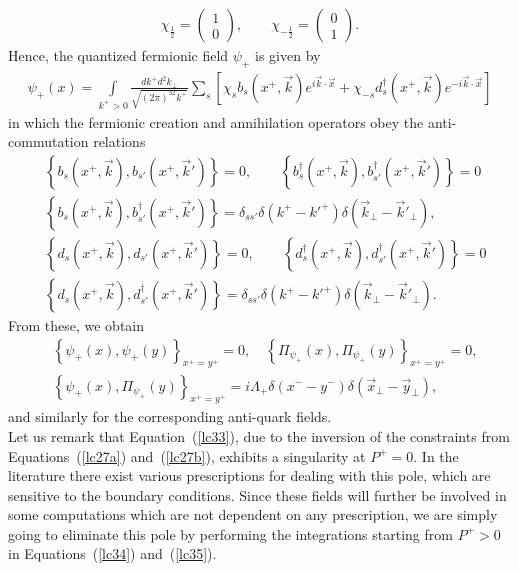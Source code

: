 \begin{align*}
\chi_{\frac{1}{2}}=\begin{pmatrix}1 \\ 0 \end{pmatrix}, \qquad \chi_{-\frac{1}{2}}=\begin{pmatrix}0 \\ 1 \end{pmatrix}.
\end{align*}
Hence, the quantized fermionic field $\psi_+$ is given by
\begin{align}\label{lc35}
\psi_+(x)=\int\limits_{k^+>0}\frac{dk^+d^2k_\perp}{\sqrt{(2\pi)^32k^+}}\sum_s\left[\chi_sb_s(x^+,\vec{k})e^{i\vec{k}\cdot \vec{x}}+\chi_{-s}d_s^\dag(x^+,\vec{k}) e^{-i\vec{k}\cdot \vec{x}}\right]
\end{align}
in which the fermionic creation and annihilation operators obey the anti-commutation relations
\begin{equation}\label{lc39}
   \begin{aligned}
    &\left\lbrace b_s(x^+,\vec{k}),b_{s'}(x^+,\vec{k}')\right\rbrace=0,\qquad \left\lbrace b_s^\dag(x^+,\vec{k}),b_{s'}^\dag(x^+,\vec{k}')\right\rbrace=0\\
    &\left\lbrace b_s(x^+,\vec{k}),b_{s'}^\dag(x^+,\vec{k}')\right\rbrace=\delta_{ss'}\delta(k^+-k'^+)\delta\left(\vec{k}_\perp-\vec{k}'_\perp\right),\\
    &\left\lbrace d_s(x^+,\vec{k}),d_{s'}(x^+,\vec{k}')\right\rbrace=0,\qquad \left\lbrace d_s^\dag(x^+,\vec{k}),d_{s'}^\dag(x^+,\vec{k}')\right\rbrace=0\\
    &\left\lbrace d_s(x^+,\vec{k}),d_{s'}^\dag(x^+,\vec{k}')\right\rbrace=\delta_{ss'}\delta(k^+-k'^+)\delta(\vec{k}_\perp-\vec{k}'_\perp).
\end{aligned} 
\end{equation}
From these, we obtain
\begin{equation*}
\begin{aligned}
&\left\lbrace\psi_+(x),\psi_+(y)\right\rbrace_{x^+=y^+}=0,\quad \left\lbrace\Pi_{\psi_+}(x),\Pi_{\psi_+}(y)\right\rbrace_{x^+=y^+}=0,\\
&\left\lbrace\psi_+(x),\Pi_{\psi_+}(y)\right\rbrace_{x^+=y^+}=i\Lambda_+\delta(x^--y^-)\delta(\vec{x}_\perp-\vec{y}_\perp),
\end{aligned}
\end{equation*}
and similarly for the corresponding anti-quark fields. \\ \noindent
Let us remark that Equation~(\cref{lc33}), due to the inversion of the constraints from Equations~(\cref{lc27a}) and~(\cref{lc27b}), exhibits a singularity at $P^+=0$. In the literature there exist various prescriptions for dealing with this pole, which are sensitive to the boundary conditions. Since these fields will further be involved in some computations which are not dependent on any prescription, we are simply going to eliminate this pole by performing the integrations starting from $P^+>0$ in Equations~(\cref{lc34}) and~(\cref{lc35}).


